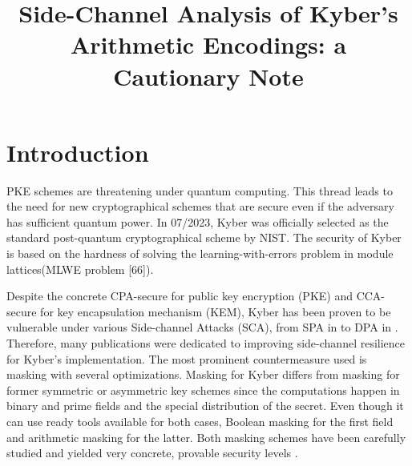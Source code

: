 \documentclass{llncs}
\begin{document}
 

\title{Side-Channel Analysis of Kyber's	Arithmetic Encodings: a Cautionary Note}
\maketitle

\begin{abstract}

\end{abstract}


\section{Introduction}

PKE schemes are threatening under quantum computing. This thread leads to the need for new cryptographical schemes that are secure even if the adversary has sufficient quantum power. In 07/2023, Kyber was officially selected as the standard post-quantum cryptographical scheme by NIST. The security of Kyber is based on the hardness of solving the learning-with-errors problem in module lattices(MLWE problem [66]).

Despite the concrete CPA-secure for public key encryption (PKE) and CCA-secure for key encapsulation mechanism (KEM), Kyber has been proven to be vulnerable under various Side-channel Attacks (SCA), from SPA in  to DPA in . Therefore, many publications were dedicated to improving side-channel resilience for Kyber's implementation. The most prominent countermeasure used is masking with several optimizations.
Masking for Kyber differs from masking for former symmetric or asymmetric key schemes since the computations happen in binary and prime fields and the special distribution of the secret. Even though it can use ready tools available for both cases, Boolean masking for the first field and arithmetic masking for the latter. Both masking schemes have been carefully studied and yielded very concrete, provable security levels .
\end{document}
